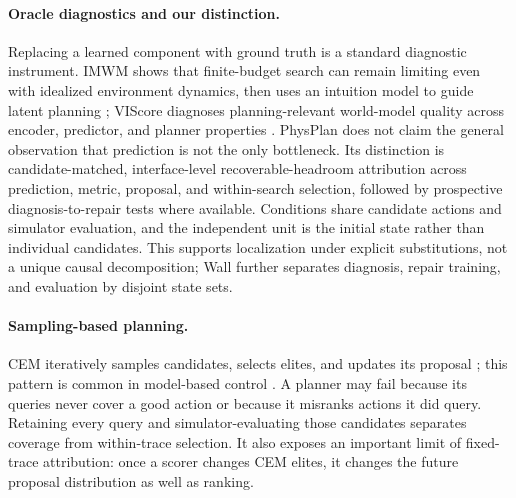 \paragraph{Oracle diagnostics and our distinction.}
Replacing a learned component with ground truth is a standard diagnostic instrument. IMWM shows that finite-budget search can remain limiting even with idealized environment dynamics, then uses an intuition model to guide latent planning \citep{gao2026imwm}; VIScore diagnoses planning-relevant world-model quality across encoder, predictor, and planner properties \citep{wu2026viscore}. PhysPlan does not claim the general observation that prediction is not the only bottleneck. Its distinction is candidate-matched, interface-level recoverable-headroom attribution across prediction, metric, proposal, and within-search selection, followed by prospective diagnosis-to-repair tests where available. Conditions share candidate actions and simulator evaluation, and the independent unit is the initial state rather than individual candidates. This supports localization under explicit substitutions, not a unique causal decomposition; Wall further separates diagnosis, repair training, and evaluation by disjoint state sets.

\paragraph{Sampling-based planning.}
CEM iteratively samples candidates, selects elites, and updates its proposal \citep{rubinstein1999cem}; this pattern is common in model-based control \citep{chua2018pets,hafner2019planet}. A planner may fail because its queries never cover a good action or because it misranks actions it did query. Retaining every query and simulator-evaluating those candidates separates coverage from within-trace selection. It also exposes an important limit of fixed-trace attribution: once a scorer changes CEM elites, it changes the future proposal distribution as well as ranking.
